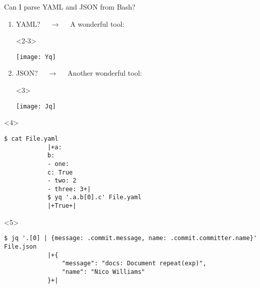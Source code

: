 \begin{frame}[fragile]{Can I parse YAML and JSON from Bash?}
    \vspace{-2mm}
    \begin{enumerate}
        \item<2-> YAML? $\quad\to\quad$ A wonderful tool: \\[1mm]
              \begin{onlyenv}<2-3>
                  \begin{center}
                      \texttt{[image: Yq]}
                  \end{center}
              \end{onlyenv}
        \item<3-> JSON? $\quad\to\quad$ Another wonderful tool: \\[1mm]
              \begin{onlyenv}<3>
                  \begin{center}
                      \texttt{[image: Jq]}
                  \end{center}
              \end{onlyenv}
    \end{enumerate}
    \vspace{2mm}
    \begin{onlyenv}<4>
        \begin{center}
        \end{center}
        \begin{lstlisting}[style=MyBash, numbers=none]
            $ cat File.yaml
            |+a:
            b:
            - one:
            c: True
            - two: 2
            - three: 3+|
            $ yq '.a.b[0].c' File.yaml
            |+True+|
        \end{lstlisting}
    \end{onlyenv}
    \begin{onlyenv}<5>
        \begin{center}
        \end{center}
        \begin{lstlisting}[style=MyBash, numbers=none]
            $ jq '.[0] | {message: .commit.message, name: .commit.committer.name}' File.json
            |+{
                "message": "docs: Document repeat(exp)",
                "name": "Nico Williams"
            }+|
        \end{lstlisting}
    \end{onlyenv}
\end{frame}
